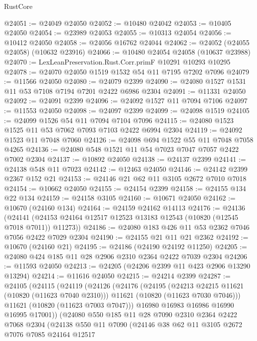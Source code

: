 \begin{lexlean}{RustCore}
\begin{coremodule}
@24051 := @24049 @24050
@24052 := @10480 @24042
@24053 := @10405 @24050
@24054 := @23989 @24053
@24055 := @10313 @24054
@24056 := @10412 @24050
@24058 := @24056 @16762 @24044
@24062 := @24052 (@24055 @24058) (@10632 @23916)
@24066 := @10480 @24054 @24058 (@10637 @23988)
@24070 := LexLeanPreservation.Rust.Corr.primF @10291 @10293 @10295
@24078 := @24070 @24050 @1519 @1532 @54 @11 @7195 @7202 @7096
@24079 := @11566 @24050
@24080 := @24079 @2399
@24090 := @24080 @1527 @1531 @11 @53 @7108 @7194 @7201 @2422 @6986 @2304
@24091 := @11331 @24050
@24092 := @24091 @2399
@24096 := @24092 @1527 @11 @7094 @7106
@24097 := @11553 @24050
@24098 := @24097 @2399
@24099 := @24098 @1519
@24105 := @24099 @1526 @54 @11 @7094 @7104 @7096
@24115 := @24080 @1523 @1525 @11 @53 @7062 @7093 @7103 @2422 @6994 @2304
@24119 := @24092 @1523 @11 @7048 @7060
@24126 := @24098 @694 @1522 @55 @11 @7048 @7058 @4265
@24136 := @24080 @548 @1521 @11 @54 @7023 @7047 @7057 @2422 @7002 @2304
@24137 := @10892 @24050
@24138 := @24137 @2399
@24141 := @24138 @548 @11 @7023
@24142 := @12463 @24050
@24146 := @24142 @2399 @2367 @152 @21
@24153 := @24146 @21 @62 @11 @3105 @2672 @7010 @7018
@24154 := @10662 @24050
@24155 := @24154 @2399
@24158 := @24155 @134 @22 @134
@24159 := @24158 @3105
@24160 := @10671 @24050
@24162 := @10670 (@24160 @134)
@24164 := @24159 @24162 @14113
@24176 := @24136
    (@24141 (@24153 @24164 @12517 @12523 @13183 @12543 (@10820 (@12545 @7018 @7011)) @11273))
@24186 := @24080 @183 @426 @11 @53 @2362 @7046 @7056 @2422 @7029 @2304
@24190 := @24155 @21 @11 @21 @2362
@24192 := @10670 (@24160 @21)
@24195 := @24186 (@24190 @24192 @11250)
@24205 := @24080 @424 @185 @11 @28 @2906 @2310 @2364 @2422 @7039 @2304
@24206 := @11593 @24050
@24213 := @24205 (@24206 @2399 @11 @423 @2906 @13290 @13294)
@24214 := @11616 @24050
@24215 := @24214 @2399
@24287 := @24105
    (@24115
      (@24119
        (@24126
          (@24176
            (@24195
              (@24213 @24215 @11621 (@10820 (@11623 @7040 @2310)))
              @11621
              (@10820 (@11623 @7030 @7046)))
            @11621
            (@10820 (@11623 @7003 @7047)))
          @16980
          @16983
          @16986
          @16990
          @16995
          @17001))
      (@24080
        @550
        @185
        @11
        @28
        @7090
        @2310
        @2364
        @2422
        @7068
        @2304
        (@24138
          @550
          @11
          @7090
          (@24146
            @38
            @62
            @11
            @3105
            @2672
            @7076
            @7085
            @24164
            @12517

\end{coremodule}
\end{lexlean}
